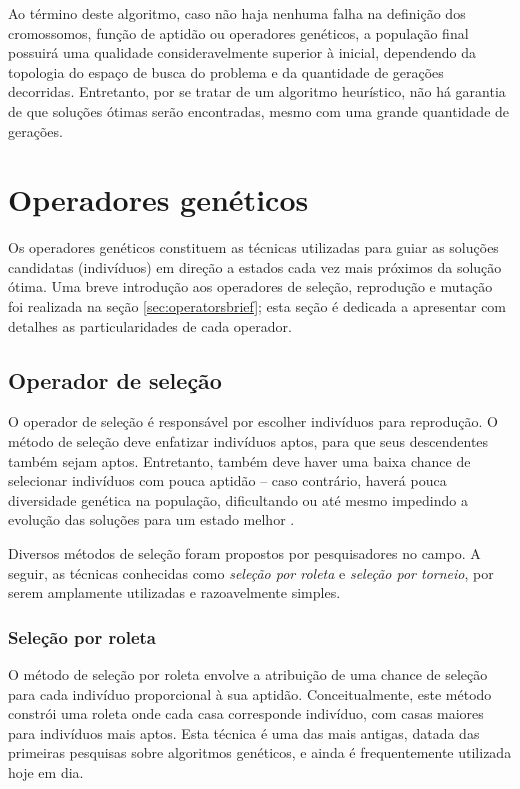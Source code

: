 \documentclass[12pt]{article}
\begin{document}
Ao término deste algoritmo, caso não haja nenhuma falha na definição dos cromossomos, função de aptidão ou operadores genéticos, a população final possuirá uma qualidade consideravelmente superior à inicial, dependendo da topologia do espaço de busca do problema e da quantidade de gerações decorridas. Entretanto, por se tratar de um algoritmo heurístico, não há garantia de que soluções ótimas serão encontradas, mesmo com uma grande quantidade de gerações.

\section{Operadores genéticos} \label{sec:geneticoperators}

Os operadores genéticos constituem as técnicas utilizadas para guiar as soluções candidatas (indivíduos) em direção a estados cada vez mais próximos da solução ótima. Uma breve introdução aos operadores de seleção, reprodução e mutação foi realizada na seção \ref{sec:operatorsbrief}; esta seção é dedicada a apresentar com detalhes as particularidades de cada operador.

\subsection{Operador de seleção}

O operador de seleção é responsável por escolher indivíduos para reprodução. O método de seleção deve enfatizar indivíduos aptos, para que seus descendentes também sejam aptos. Entretanto, também deve haver uma baixa chance de selecionar indivíduos com pouca aptidão -- caso contrário, haverá pouca diversidade genética na população, dificultando ou até mesmo impedindo a evolução das soluções para um estado melhor \cite{Mitchell1998}.

Diversos métodos de seleção foram propostos por pesquisadores no campo. A seguir, as técnicas conhecidas como \textit{seleção por roleta} e \textit{seleção por torneio}, por serem amplamente utilizadas e razoavelmente simples.

\subsubsection{Seleção por roleta} \label{sec:roulette}

O método de seleção por roleta envolve a atribuição de uma chance de seleção para cada indivíduo proporcional à sua aptidão. Conceitualmente, este método constrói uma roleta onde cada casa corresponde indivíduo, com casas maiores para indivíduos mais aptos. Esta técnica é uma das mais antigas, datada das primeiras pesquisas sobre algoritmos genéticos, e ainda é frequentemente utilizada hoje em dia.
\end{document}
